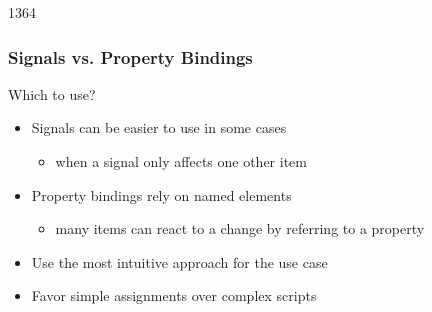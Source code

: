 
\begin{slide}{1364}\frametitle{Signals vs. Property Bindings}

Which to use?

\begin{itemize}
\item Signals can be easier to use in some cases
  \begin{itemize}
  \item when a signal only affects one other item
  \end{itemize}
\item Property bindings rely on named elements
  \begin{itemize}
  \item many items can react to a change by referring to a property
  \end{itemize}
\item Use the most intuitive approach for the use case
\item Favor simple assignments over complex scripts
\end{itemize}


\end{slide}


